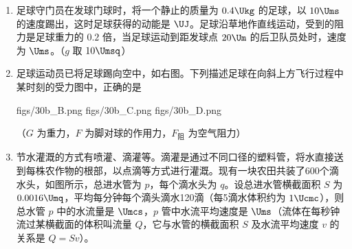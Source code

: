 \documentclass[\gkver]{gaokaozhenti}
\begin{document}
\begin{enumerate}

{336座}
{378座}
{408座}


\item
足球守门员在发球门球时，将一个静止的质量为 $0.4\Ukg$ 的足球，以 $10\Ums$ 的速度踢出，这时足球获得的动能是 $\UJ$。足球沿草地作直线运动，受到的阻力是足球重力的 $0.2$ 倍，当足球运动到距发球点 $20\Um$ 的后卫队员处时，速度为 $\Ums$。（$g$ 取 $10\Umsq$）




\item
足球运动员已将足球踢向空中，如右图。下列描述足球在向斜上方飞行过程中某时刻的受力图中，正确的是

{figs/30b_B.png}
{figs/30b_C.png}
{figs/30b_D.png}

（$G$ 为重力，$F$ 为脚对球的作用力，$F_{\text{阻}}$ 为空气阻力）


\item
节水灌溉的方式有喷灌、滴灌等。滴灌是通过不同口径的塑料管，将水直接送到每株农作物的根部，以点滴等方式进行灌溉。现有一块农田共装了600个滴水头，如图所示，总进水管为 $p$，每个滴水头为 $q$。设总进水管横截面积 $S$ 为 $0.0016\Umq$，平均每分钟每个滴头滴水120滴（每5滴水体积约为 $1\Ucmc$），则总水管 $p$ 中的水流量是 $\Umcs$，$p$ 管中水流平均速度是 $\Ums$（流体在每秒钟流过某横截面的体积叫流量 $Q$，它与水管的横截面积 $S$ 及水流平均速度 $v$ 的关系是 $Q=Sv$）。


\end{enumerate}
\end{document}

